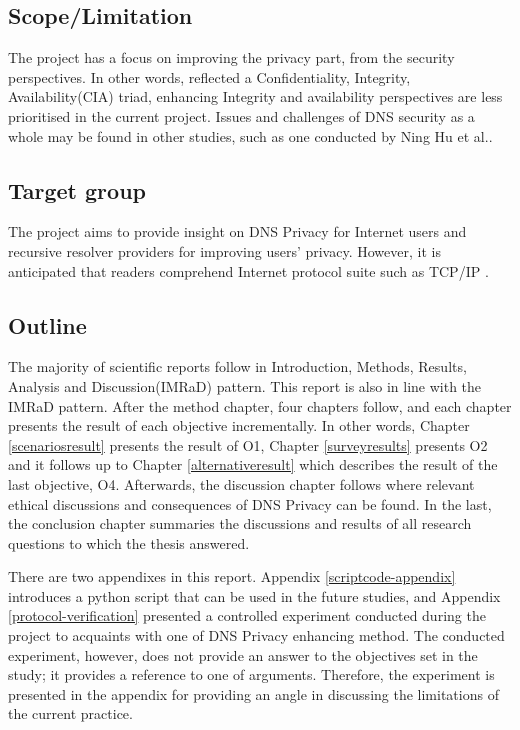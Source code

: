 \documentclass[a4paper,12pt]{article}
\begin{document}
\subsection{Scope/Limitation}
The project has a focus on improving the privacy part, from the security perspectives. In other words, reflected a Confidentiality, Integrity, Availability(CIA) triad, enhancing Integrity and availability perspectives are less prioritised in the current project. Issues and challenges of DNS security as a whole may be found in other studies, such as one conducted by Ning Hu et al.\cite{ning2017dnssecurity}. 

\subsection{Target group}
The project aims to provide insight on DNS Privacy for Internet users and recursive resolver providers for improving users' privacy.
However, it is anticipated that readers comprehend Internet protocol suite such as TCP/IP \cite{rfc1122}.

\subsection{Outline}
The majority of scientific reports follow in Introduction, Methods, Results, Analysis and Discussion(IMRaD) pattern.
This report is also in line with the IMRaD pattern. After the method chapter, four chapters follow, and each chapter presents the result of each objective incrementally. In other words, Chapter \ref{scenariosresult} presents the result of O1, Chapter \ref{surveyresults} presents O2 and it follows up to Chapter \ref{alternativeresult} which describes the result of the last objective, O4.
Afterwards, the discussion chapter follows where relevant ethical discussions and consequences of DNS Privacy can be found. In the last, the conclusion chapter summaries the discussions and results of all research questions to which the thesis answered.

There are two appendixes in this report.
Appendix \ref{scriptcode-appendix} introduces a python script that can be used in the future studies, and Appendix \ref{protocol-verification} presented a controlled experiment conducted during the project to acquaints with one of DNS Privacy enhancing method.
The conducted experiment, however, does not provide an answer to the objectives set in the study; it provides a reference to one of arguments.
Therefore, the experiment is presented in the appendix for providing an angle in discussing the limitations of the current practice.
\end{document}
